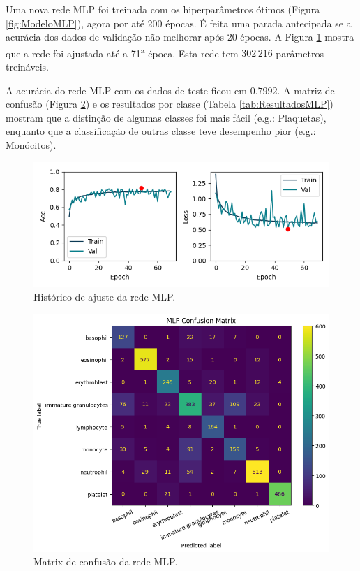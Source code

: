 \documentclass[final,5p]{elsarticle}
\numberwithin{equation}{section}
\begin{document}
     Uma nova rede MLP foi treinada com os hiperparâmetros ótimos (Figura \ref{fig:ModeloMLP}), agora por até 200 épocas. É feita uma parada antecipada se a acurácia dos dados de validação não melhorar após 20 épocas. A Figura \ref{fig:HistoricoMLP} mostra que a rede foi ajustada até a 71\textsuperscript{a} época. Esta rede tem $302\,216$ parâmetros treináveis.

     A acurácia do rede MLP com os dados de teste ficou em $0.7992$. A matriz de confusão (Figura \ref{fig:MatrizConfusaoMLP}) e os resultados por classe (Tabela \ref{tab:ResultadosMLP}) mostram que a distinção de algumas classes foi mais fácil (e.g.: Plaquetas), enquanto que a classificação de outras classe teve desempenho pior (e.g.: Monócitos).

    \begin{figure}[hbt!]
        \includegraphics[width=0.95\columnwidth]{MLP_history_cropped.png}
        \caption{Histórico de ajuste da rede MLP.}\label{fig:HistoricoMLP}
    \end{figure}

    \begin{figure}[hbt!]
        \includegraphics[width=0.95\columnwidth]{MLP_cm.png}
        \caption{Matrix de confusão da rede MLP.}\label{fig:MatrizConfusaoMLP}
    \end{figure}
\end{document}
